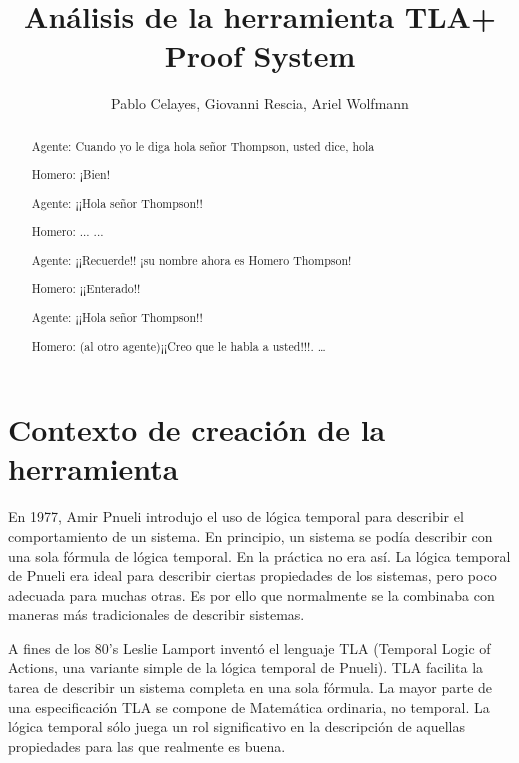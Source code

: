 \documentclass[spanish]{llncs}
\begin{document}
%

\mainmatter              %
%
\title{Análisis de la herramienta TLA+ Proof System}
%
%
\author{Pablo Celayes, Giovanni Rescia, Ariel Wolfmann}

%

\maketitle              %

\begin{abstract}
Agente: Cuando yo le diga hola señor Thompson, usted dice, hola

Homero: ¡Bien!

Agente: ¡¡Hola señor Thompson!!

Homero: ... ...

Agente: ¡¡Recuerde!! ¡su nombre ahora es Homero Thompson!

Homero: ¡¡Enterado!!

Agente: ¡¡Hola señor Thompson!!

Homero: (al otro agente)¡¡Creo que le habla a usted!!!. \dots

\end{abstract}
%

\section{Contexto de creación de la herramienta}

 En 1977, Amir Pnueli introdujo el uso de lógica temporal para describir el comportamiento de un sistema. En principio, un sistema se podía describir con una sola fórmula de lógica temporal. En la práctica no era así. La lógica temporal de Pnueli era ideal para describir ciertas propiedades de los sistemas, pero poco adecuada para muchas otras. Es por ello que normalmente se la combinaba con maneras más tradicionales de describir sistemas. \cite{pnueli}

A fines de los 80's Leslie Lamport inventó el lenguaje TLA (Temporal Logic of Actions,
una variante simple de la lógica temporal de Pnueli). TLA facilita la tarea de describir un sistema completa en una sola fórmula. La mayor parte de una especificación TLA se compone de Matemática ordinaria, no temporal. La lógica temporal sólo juega un rol significativo en la descripción de aquellas propiedades para las que realmente es buena. \cite{specsys}
\end{document}
